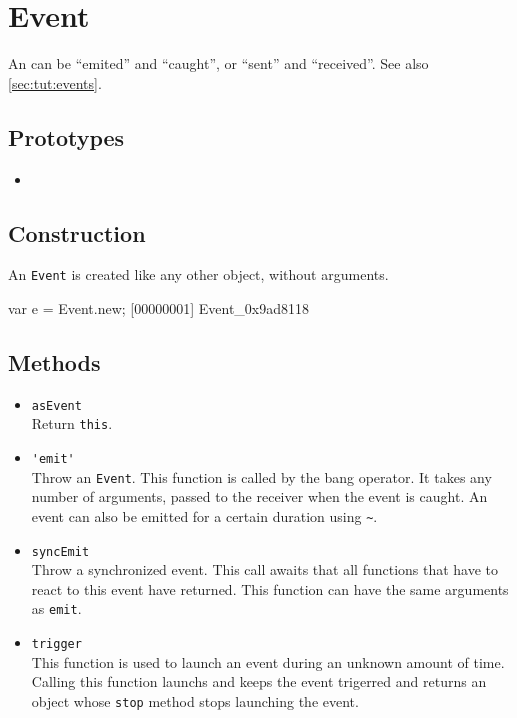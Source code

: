 \section{Event}

An  can be ``emited'' and ``caught'', or ``sent'' and
``received''.  See also \autoref{sec:tut:events}.

\subsection{Prototypes}
\begin{itemize}
\item {}
\end{itemize}

\subsection{Construction}

An \lstinline{Event} is created like any other object, without
arguments.

\begin{urbiscript}
var e = Event.new;
[00000001] Event_0x9ad8118
\end{urbiscript}

\subsection{Methods}
\begin{itemize}
\item \lstinline|asEvent|\\
  Return \lstinline|this|.

\item \lstinline|'emit'|\\
  Throw an \lstinline|Event|. This function is called by the bang
  operator.  It takes any number of arguments, passed to the receiver
  when the event is caught. An event can also be emitted for a certain
  duration using \lstinline|~|.

\item \lstinline|syncEmit|\\
  Throw a synchronized event. This call awaits that all functions that
  have to react to this event have returned.  This function can have
  the same arguments as \lstinline|emit|.

\item \lstinline|trigger|\\
  This function is used to launch an event during an unknown amount of
  time. Calling this function launchs and keeps the event trigerred
  and returns an object whose \lstinline|stop| method stops launching
  the event.
\end{itemize}

